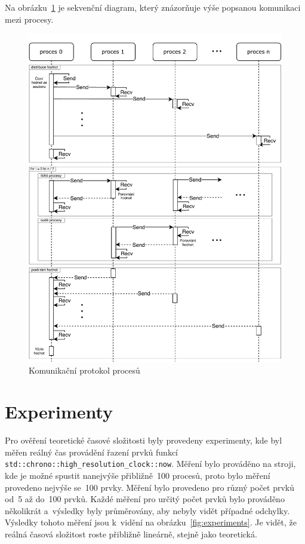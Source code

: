 \documentclass[a4paper, 10pt, twocolumn]{article}
\begin{document}
    Na obrázku~\ref{fig:seq-diagram} je sekvenční diagram, který znázorňuje
    výše popsanou komunikaci mezi procesy.

    \begin{figure}[ht]
        \centering
        \includegraphics[width=.95 \linewidth]{img/sequence-diagram.pdf}
        \caption{Komunikační protokol procesů}
		\label{fig:seq-diagram}
    \end{figure}


    \section{Experimenty}

    Pro ověření teoretické časové složitosti byly provedeny experimenty,
    kde byl měřen reálný čas provádění řazení prvků funkcí
    \texttt{std::chrono::high\_resolution\_clock::now}. Měření bylo prováděno
    na stroji, kde je možné spustit nanejvýše přibližně~100 procesů, proto
    bylo měření provedeno nejvýše se~100 prvky. Měření bylo provedeno pro
    různý počet prvků od~5 až do~100 prvků. Každé měření pro určitý počet
    prvků bylo prováděno několikrát a~výsledky byly průměrovány, aby nebyly
    vidět případné odchylky. Výsledky tohoto měření jsou k~vidění na
    obrázku~\ref{fig:experiments}. Je vidět, že reálná časová složitost roste
    přibližně lineárně, stejně jako teoretická.
\end{document}
